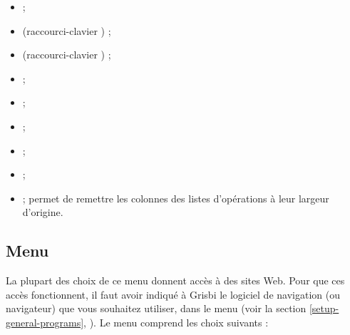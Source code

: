 \begin{itemize}
	 \item {} ; 
	 \item {} (raccourci-clavier ) ;
	 \item {} (raccourci-clavier ) ;
	 \item {} ;
	 \item {} ;
	 \item {} ;
	 \item {} ;
	 \item {} ;
	 \item {} ; permet de remettre les colonnes des listes d'opérations à leur largeur d'origine.
\end{itemize}


\subsection{Menu \label{home-menus-help}}

La plupart des choix de ce menu donnent accès à des sites Web. Pour que ces accès fonctionnent, il faut avoir indiqué à Grisbi le logiciel de navigation (ou navigateur) que vous souhaitez utiliser, dans le menu  (voir la section \vref{setup-general-programs}, ). Le menu  comprend les choix suivants :

